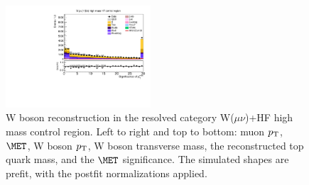 \begin{figure}[tbp]
\begin{center}
    \includegraphics[width=0.48\textwidth]{figures/wlnhbb2016/resolved/WmnWHHeavyFlavorCRHighMass_pfmetsig.pdf}
    \caption{W boson reconstruction in the resolved category W($\mu\nu$)+HF high mass control region.
    Left to right and top to bottom: muon $p_{\mathrm{T}}$, $\MET$, W boson $p_{\mathrm{T}}$, W boson transverse mass,
    the reconstructed top quark mass, and the $\MET$ significance.
    The simulated shapes are prefit, with the postfit normalizations applied.}
    \label{fig:res_WmnHFHighMass_WBosons}
  \end{center}
\end{figure}
\clearpage

